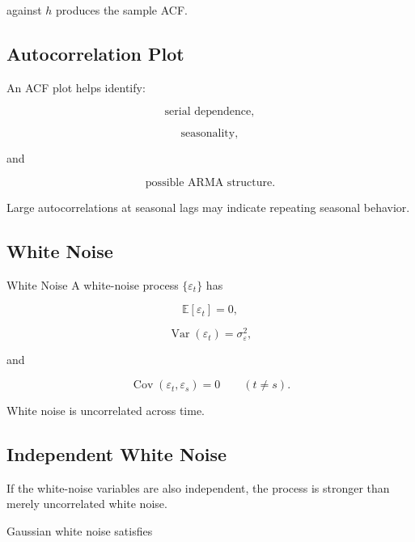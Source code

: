 against \(h\) produces the sample ACF.

\subsection{Autocorrelation Plot}
\label{subsec:acf-plot}

An ACF plot helps identify:

\[
\boxed{
\text{serial dependence},
}
\]

\[
\boxed{
\text{seasonality},
}
\]

and

\[
\boxed{
\text{possible ARMA structure}.
}
\]

Large autocorrelations at seasonal lags may indicate repeating seasonal
behavior.

\subsection{White Noise}
\label{subsec:white-noise}

\begin{definitionbox}{White Noise}
A white-noise process \(\{\varepsilon_t\}\) has

\[
\boxed{
\mathbb{E}[\varepsilon_t]=0,
}
\]

\[
\boxed{
\operatorname{Var}(\varepsilon_t)=\sigma_\varepsilon^2,
}
\]

and

\[
\boxed{
\operatorname{Cov}
(
\varepsilon_t,
\varepsilon_s
)
=
0
\qquad
(t\neq s).
}
\]
\end{definitionbox}

White noise is uncorrelated across time.

\subsection{Independent White Noise}
\label{subsec:independent-white-noise}

If the white-noise variables are also independent, the process is
stronger than merely uncorrelated white noise.

Gaussian white noise satisfies


